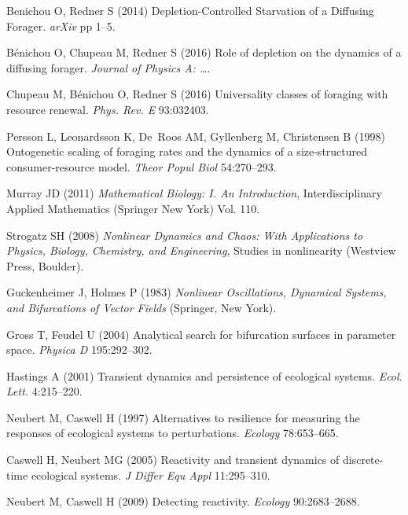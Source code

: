 \documentclass{pnastwo}
\begin{document}
\begin{article}
{\begin{thebibliography}{10}
Benichou O, Redner S
\newblock (2014) {Depletion-Controlled Starvation of a Diffusing Forager}.
\newblock \emph{arXiv} pp 1--5.

B{\'e}nichou O, Chupeau M, Redner S
\newblock (2016) {Role of depletion on the dynamics of a diffusing forager}.
\newblock \emph{Journal of Physics A: {\ldots}}.

Chupeau M, B{\'e}nichou O, Redner S
\newblock (2016) {Universality classes of foraging with resource renewal}.
\newblock \emph{Phys. Rev. E} 93:032403.

Persson L, Leonardsson K, De~Roos AM, Gyllenberg M, Christensen B
\newblock (1998) {Ontogenetic scaling of foraging rates and the dynamics of a
  size-structured consumer-resource model}.
\newblock \emph{Theor Popul Biol} 54:270--293.

Murray JD
\newblock (2011) \emph{{Mathematical Biology: I. An Introduction}},
  Interdisciplinary Applied Mathematics
\newblock (Springer New York) Vol.{} 110.

Strogatz SH
\newblock (2008) \emph{{Nonlinear Dynamics and Chaos: With Applications to
  Physics, Biology, Chemistry, and Engineering}}, Studies in nonlinearity
\newblock (Westview Press, Boulder).

Guckenheimer J, Holmes P
\newblock (1983) \emph{{Nonlinear Oscillations, Dynamical Systems, and
  Bifurcations of Vector Fields}}
\newblock (Springer, New York).

Gross T, Feudel U
\newblock (2004) {Analytical search for bifurcation surfaces in parameter
  space}.
\newblock \emph{Physica D} 195:292--302.

Hastings A
\newblock (2001) {Transient dynamics and persistence of ecological systems}.
\newblock \emph{Ecol. Lett.} 4:215--220.

Neubert M, Caswell H
\newblock (1997) {Alternatives to resilience for measuring the responses of
  ecological systems to perturbations}.
\newblock \emph{Ecology} 78:653--665.

Caswell H, Neubert MG
\newblock (2005) {Reactivity and transient dynamics of discrete-time ecological
  systems}.
\newblock \emph{J Differ Equ Appl} 11:295--310.

Neubert M, Caswell H
\newblock (2009) {Detecting reactivity}.
\newblock \emph{Ecology} 90:2683--2688.


\end{thebibliography}}
\end{article}
\end{document}
